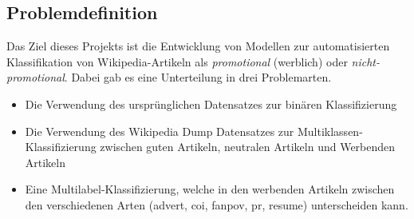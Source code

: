 \subsection{Problemdefinition}
\label{Problemdefinition}
Das Ziel dieses Projekts ist die Entwicklung von Modellen zur automatisierten Klassifikation von Wikipedia-Artikeln als \emph{promotional} (werblich) oder \emph{nicht-promotional}. Dabei gab es eine Unterteilung in drei Problemarten.
\begin{itemize}
    \item Die Verwendung des ursprünglichen Datensatzes zur binären Klassifizierung
    \item Die Verwendung des Wikipedia Dump Datensatzes zur Multiklassen-Klassifizierung zwischen guten Artikeln, neutralen Artikeln und Werbenden Artikeln
    \item Eine Multilabel-Klassifizierung, welche in den werbenden Artikeln zwischen den verschiedenen Arten (advert, coi, fanpov, pr, resume) unterscheiden kann.
\end{itemize}



